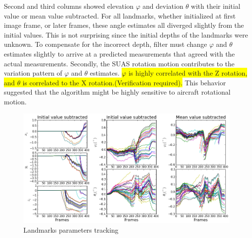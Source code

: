Second and third columns showed elevation $\varphi$ and deviation
$\theta$ with their initial value or mean value subtracted.
For all landmarks, whether initialized at first image frame, or later
frames, these angle estimates all diverged slightly from the initial
values. This is not surprising since the initial depths of the
landmarks were unknown. To compensate for the incorrect depth, filter
must change $\varphi$ and $\theta$ estimates slightly to arrive at a
predicted measurements that agreed with the actual measurements.
Secondly, the SUAS rotation motion contributes to the variation
pattern of $\varphi$ and $\theta$ estimates.
\colorbox{yellow}{$\varphi$ is highly correlated with the Z rotation,
  and $\theta$ is correlated to the X rotation.(Verification
  required).} This behavior suggested that the algorithm might be
highly sensitive to aircraft rotational motion.

\begin{figure}[h]
\centering
\includegraphics[width=14cm, keepaspectratio=true]
{./Figures/fltfig/cut1/Figure20.png}
\caption{Landmarks parameters tracking}
\label{fltfig:2}
\end{figure}
\FloatBarrier

